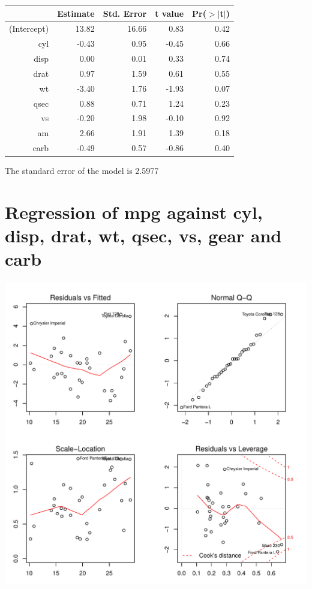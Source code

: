 \documentclass{article}\usepackage[]{graphicx}\usepackage[]{color}
\makeatletter
\def\maxwidth{ %
  \ifdim\Gin@nat@width>\linewidth
    \linewidth
  \else
    \Gin@nat@width
  \fi
}
\newenvironment{knitrout}{}{} %
\makeatother
\begin{document}
\begin{table}[ht]
\centering
\begin{tabular}{rrrrr}
  \hline
 & Estimate & Std. Error & t value & Pr($>$$|$t$|$) \\ 
  \hline
(Intercept) & 13.82 & 16.66 & 0.83 & 0.42 \\ 
  cyl & -0.43 & 0.95 & -0.45 & 0.66 \\ 
  disp & 0.00 & 0.01 & 0.33 & 0.74 \\ 
  drat & 0.97 & 1.59 & 0.61 & 0.55 \\ 
  wt & -3.40 & 1.76 & -1.93 & 0.07 \\ 
  qsec & 0.88 & 0.71 & 1.24 & 0.23 \\ 
  vs & -0.20 & 1.98 & -0.10 & 0.92 \\ 
  am & 2.66 & 1.91 & 1.39 & 0.18 \\ 
  carb & -0.49 & 0.57 & -0.86 & 0.40 \\ 
   \hline
\end{tabular}
\end{table}




The standard error of the model is 2.5977

\newpage

\section{Regression of mpg against cyl, disp, drat, wt, qsec, vs, gear and carb }
\begin{knitrout}
\color{fgcolor}

{\centering \includegraphics[width=\maxwidth]{figure/lm-cyl-disp-drat-wt-qsec-vs-gear-carb} 

}



\end{knitrout}
\end{document}
